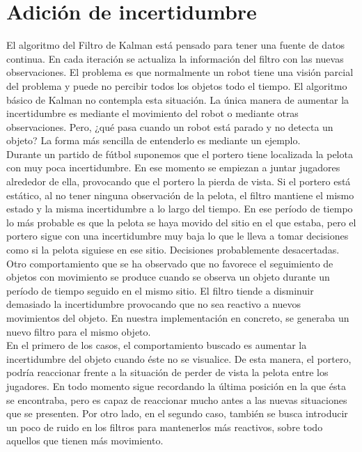 \section{Adición de incertidumbre}
\label{sec:adicionincertidumbre}

El algoritmo del Filtro de Kalman está pensado para tener una fuente de datos continua. En cada iteración se actualiza la información del filtro con las nuevas observaciones. El problema es que normalmente un robot tiene una visión parcial del problema y puede no percibir todos los objetos todo el tiempo. El algoritmo básico de Kalman no contempla esta situación. La única manera de aumentar la incertidumbre es mediante el movimiento del robot o mediante otras observaciones. Pero, ¿qué pasa cuando un robot está parado y no detecta un objeto? La forma más sencilla de entenderlo es mediante un ejemplo. \\

Durante un partido de fútbol suponemos que el portero tiene localizada la pelota con muy poca incertidumbre. En ese momento se empiezan a juntar jugadores alrededor de ella, provocando que el portero la pierda de vista. Si el portero está estático, al no tener ninguna observación de la pelota, el filtro mantiene el mismo estado y la misma incertidumbre a lo largo del tiempo. En ese período de tiempo lo más probable es que la pelota se haya movido del sitio en el que estaba, pero el portero sigue con una incertidumbre muy baja lo que le lleva a tomar decisiones como si la pelota siguiese en ese sitio. Decisiones probablemente desacertadas. \\

Otro comportamiento que se ha observado que no favorece el seguimiento de objetos con movimiento se produce cuando se observa un objeto durante un período de tiempo seguido en el mismo sitio. El filtro tiende a disminuir demasiado la incertidumbre provocando que no sea reactivo a nuevos movimientos del objeto. En nuestra implementación en concreto, se generaba un nuevo filtro para el mismo objeto. \\

En el primero de los casos, el comportamiento buscado es aumentar la incertidumbre del objeto cuando éste no se visualice. De esta manera, el portero, podría reaccionar frente a la situación de perder de vista la pelota entre los jugadores. En todo momento sigue recordando la última posición en la que ésta se encontraba, pero es capaz de reaccionar mucho antes a las nuevas situaciones que se presenten. Por otro lado, en el segundo caso, también se busca introducir un poco de ruido en los filtros para mantenerlos más reactivos, sobre todo aquellos que tienen más movimiento. \\

